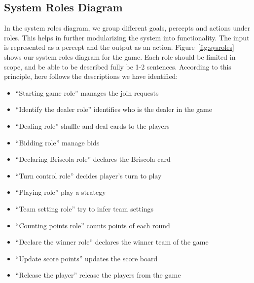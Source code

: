 \documentclass[a4paper]{article}
\begin{document}
\subsection{System Roles Diagram}

In the system roles diagram, we group different goals, percepts and actions under roles. This helps in further modularizing the system into functionality. The input is represented as a percept and the output as an action. Figure~\ref{fig:sysroles} shows our system roles diagram for the game. Each role should be limited in scope, and be able to be described fully be 1-2 sentences. According to this principle, here follows the descriptions we have identified:
\begin{itemize}
  \item ``Starting game role'' manages the join requests
  \item ``Identify the dealer role'' identifies who is the dealer in the game
  \item ``Dealing role'' shuffle and deal cards to the players
  \item ``Bidding role'' manage bids
  \item ``Declaring Briscola role'' declares the Briscola card
  \item ``Turn control role'' decides player's turn to play
  \item ``Playing role'' play a strategy
  \item ``Team setting role'' try to infer team settings
  \item ``Counting points role'' counts points of each round
  \item ``Declare the winner role'' declares the winner team of the game
  \item ``Update score points'' updates the score board 
  \item ``Release the player'' release the players from the game
\end{itemize} 
\end{document}
